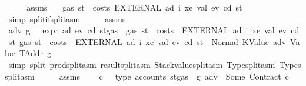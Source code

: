 \begin{isabellebody}
%
\isadelimproof
%
\endisadelimproof
%
\isatagproof
{}\isamarkupfalse%
\ {\isacharminus}{\kern0pt}\isanewline
\ \ \isamarkupfalse%
\ assms\ \isamarkupfalse%
\ {}{\isacharcolon}{\kern0pt}\ {\isachardoublequoteopen}gas\ st\ {\isachargreater}{\kern0pt}\ costs\ {\isacharparenleft}{\kern0pt}EXTERNAL\ ad{\isacharprime}{\kern0pt}\ i\ xe\ val{\isacharparenright}{\kern0pt}\ ev\ cd\ st{\isachardoublequoteclose}\ \isamarkupfalse%
\ {\isacharparenleft}{\kern0pt}simp\ split{\isacharcolon}{\kern0pt}if{\isacharunderscore}{\kern0pt}split{\isacharunderscore}{\kern0pt}asm{\isacharparenright}{\kern0pt}\isanewline
\ \ \isamarkupfalse%
\ \isamarkupfalse%
\ assms\ {}\ \isamarkupfalse%
\ adv\ g\ \ {}{\isacharcolon}{\kern0pt}\ {\isachardoublequoteopen}expr\ ad{\isacharprime}{\kern0pt}\ ev\ cd\ {\isacharparenleft}{\kern0pt}st{\isasymlparr}gas\ {\isacharcolon}{\kern0pt}{\isacharequal}{\kern0pt}\ gas\ st\ {\isacharminus}{\kern0pt}\ costs\ \ {\isacharparenleft}{\kern0pt}EXTERNAL\ ad{\isacharprime}{\kern0pt}\ i\ xe\ val{\isacharparenright}{\kern0pt}\ ev\ cd\ st{\isasymrparr}{\isacharparenright}{\kern0pt}\ {\isacharparenleft}{\kern0pt}gas\ st\ {\isacharminus}{\kern0pt}\ costs\ \ {\isacharparenleft}{\kern0pt}EXTERNAL\ ad{\isacharprime}{\kern0pt}\ i\ xe\ val{\isacharparenright}{\kern0pt}\ ev\ cd\ st{\isacharparenright}{\kern0pt}\ {\isacharequal}{\kern0pt}\ Normal\ {\isacharparenleft}{\kern0pt}{\isacharparenleft}{\kern0pt}KValue\ adv{\isacharcomma}{\kern0pt}\ Value\ TAddr{\isacharparenright}{\kern0pt}{\isacharcomma}{\kern0pt}\ g{\isacharparenright}{\kern0pt}{\isachardoublequoteclose}\ \isamarkupfalse%
\ {\isacharparenleft}{\kern0pt}simp\ split{\isacharcolon}{\kern0pt}\ prod{\isachardot}{\kern0pt}split{\isacharunderscore}{\kern0pt}asm\ result{\isachardot}{\kern0pt}split{\isacharunderscore}{\kern0pt}asm\ Stackvalue{\isachardot}{\kern0pt}split{\isacharunderscore}{\kern0pt}asm\ Type{\isachardot}{\kern0pt}split{\isacharunderscore}{\kern0pt}asm\ Types{\isachardot}{\kern0pt}split{\isacharunderscore}{\kern0pt}asm{\isacharparenright}{\kern0pt}\isanewline
\ \ \isamarkupfalse%
\ \isamarkupfalse%
\ assms\ {}\ {}\ \isamarkupfalse%
\ c\ \ {}{\isacharcolon}{\kern0pt}\ {\isachardoublequoteopen}type\ {\isacharparenleft}{\kern0pt}accounts\ {\isacharparenleft}{\kern0pt}st{\isasymlparr}gas\ {\isacharcolon}{\kern0pt}{\isacharequal}{\kern0pt}\ g{\isasymrparr}{\isacharparenright}{\kern0pt}\ adv{\isacharparenright}{\kern0pt}\ {\isacharequal}{\kern0pt}\ Some\ {\isacharparenleft}{\kern0pt}Contract\ c{\isacharparenright}{\kern0pt}{\isachardoublequoteclose}\ \isamarkupfalse%

\end{isabellebody}
